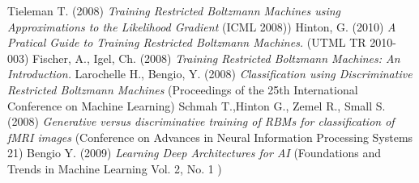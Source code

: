 \documentclass[a4paper]{scrartcl}
\begin{document}
\begin{thebibliography}{9}
	 Tieleman T. (2008) \emph {Training Restricted Boltzmann Machines using Approximations to
the Likelihood Gradient} (ICML 2008))
    Hinton, G. (2010) \emph{A Pratical Guide to Training Restricted Boltzmann Machines.} (UTML TR 2010-003)
    Fischer, A., Igel, Ch. (2008) \emph{Training Restricted Boltzmann Machines: An Introduction.} 
    Larochelle H., Bengio, Y. (2008) \emph {Classification using Discriminative Restricted Boltzmann Machines} (Proceedings of the 25th International Conference on Machine Learning)
    Schmah T.,Hinton G., Zemel R., Small S. (2008) \emph {Generative versus discriminative training of RBMs
for classification of fMRI images} (Conference on Advances in Neural Information Processing Systems 21)
	 Bengio Y. (2009) \emph {Learning Deep Architectures for AI} (Foundations and Trends in Machine Learning
Vol. 2, No. 1 )

\end{thebibliography}
\end{document}
